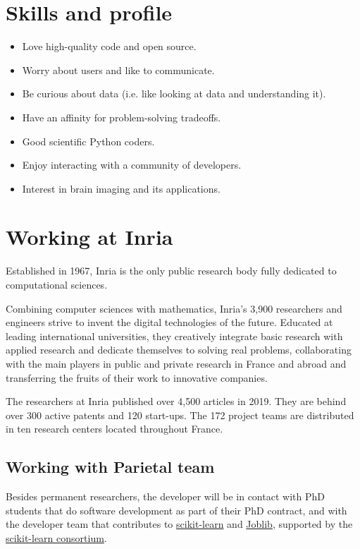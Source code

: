 \documentclass{article}
\begin{document}
\section*{Skills and profile}

\begin{itemize}
	\item Love high-quality code and open source.
	\item Worry about users and like to communicate.
	\item Be curious about data (i.e. like looking at data and understanding it).
	\item Have an affinity for problem-solving tradeoffs.
	\item Good scientific Python coders.
	\item Enjoy interacting with a community of developers.
	\item Interest in brain imaging and its applications.
\end{itemize}


\section*{Working at Inria}

Established in 1967, Inria is the only public research body fully dedicated to computational sciences.

Combining computer sciences with mathematics, Inria’s 3,900 researchers and engineers strive to invent the digital technologies of the future. Educated at leading international universities, they creatively integrate basic research with applied research and dedicate themselves to solving real problems, collaborating with the main players in public and private research in France and abroad and transferring the fruits of their work to innovative companies.

The researchers at Inria published over 4,500 articles in 2019. They are behind over 300 active patents and 120 start-ups. The 172 project teams are distributed in ten research centers located throughout France.

\subsection*{Working with Parietal team}

Besides permanent researchers, the developer will be in contact with PhD students that do software development as part of their PhD contract, and with the developer team that contributes to \href{https://scikit-learn.org/stable/}{scikit-learn} and \href{https://joblib.readthedocs.io/en/latest/}{Joblib}, supported by the \href{https://scikit-learn.fondation-inria.fr/accueil/}{scikit-learn consortium}.
\end{document}
